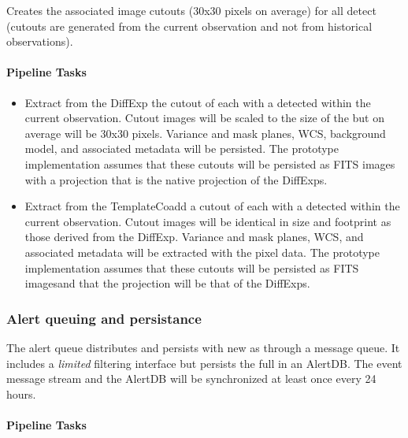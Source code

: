Creates the associated image cutouts (30x30 pixels on average) for all detect \DIAObjects (cutouts are generated from the current observation and not from historical observations).

\paragraph{Pipeline Tasks}

 \begin{itemize}
\item Extract from the DiffExp the cutout of each \DIAObject with a \DIASource detected within the current observation.  Cutout images will be scaled to the size of the \DIASource but on average will be 30x30 pixels. Variance and mask planes, WCS, background model, and associated metadata will be persisted. The prototype implementation assumes that these cutouts will be persisted as FITS images with a projection that is the  native projection of the DiffExps.

\item Extract from the TemplateCoadd  a cutout of each \DIAObject with a \DIASource detected within the current observation.  Cutout images will be identical in size and footprint as those derived from the DiffExp. Variance and mask planes, WCS, and associated metadata will be extracted with the pixel data. The prototype implementation assumes that these cutouts will be persisted as FITS imagesand that the projection will be that of  the DiffExps.
\end{itemize}

\subsubsection{Alert queuing and persistance}
\label{sec:apQueue}

The alert queue  distributes and persists \DIAObject with new \DIASources as \VOEvents through a message queue. It includes a \textit{limited} filtering interface but persists the full \VOEvents in an AlertDB. The event message stream and the AlertDB will be  synchronized at least once every 24 hours.


\paragraph{Pipeline Tasks}

